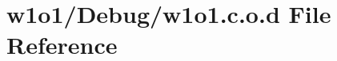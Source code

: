 \hypertarget{w1o1_8c_8o_8d}{}\section{w1o1/\+Debug/w1o1.c.\+o.\+d File Reference}
\label{w1o1_8c_8o_8d}
